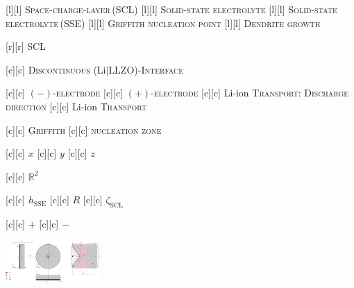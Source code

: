[l][l] {\scriptsize \textsc{Space-charge-layer\,(SCL)}}
[l][l]  {\scriptsize \textsc{Solid-state electrolyte}}
[l][l]  {\scriptsize \textsc{Solid-state electrolyte\,(SSE)}}
[l][l] {\scriptsize \textsc{Griffith nucleation point}}
[l][l] {\scriptsize \textsc{Dendrite growth}}

[r][r]  {\tiny \textsc{SCL}}

[c][c] {\scriptsize \textsc{Discontinuous} (Li$|$LLZO)-\textsc{Interface}}

[c][c] {\scriptsize $(-)$-\textsc{electrode}}
[c][c] {\scriptsize $(+)$-\textsc{electrode}}
[c][c] {\scriptsize Li-ion \textsc{Transport}: \textsc{Discharge direction}}
[c][c] {\scriptsize Li-ion \textsc{Transport}}

[c][c]   {\scriptsize \textsc{Griffith}}
[c][c] {\scriptsize \textsc{nucleation zone}}

[c][c] {\scriptsize $x$}
[c][c] {\scriptsize $y$}
[c][c] {\scriptsize $z$}

[c][c] {\scriptsize $\mathbb{R}^{2}$}

[c][c]  {\scriptsize $h_{\text{SSE}}$}
[c][c] {\scriptsize $R$}
[c][c] {\scriptsize $\zeta_{\text{SCL}}$}

[c][c]  {\tiny $+$}
[c][c]  {\tiny $-$}

\includegraphics[width=0.27\textwidth]{space_charge_layer_merged.eps}